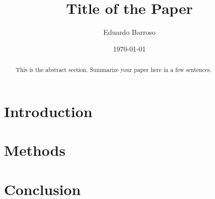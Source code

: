 \documentclass{document_layout}
\title{Title of the Paper}
\author{Eduardo Barroso}
\date{\today}
\begin{document}
\maketitle

\begin{abstract}
This is the abstract section. Summarize your paper here in a few sentences.
\end{abstract}
    
\section*{Introduction}


\section*{Methods}
%

\section*{Conclusion}
%

\onecolumn
\printbibliography
\twocolumn
\end{document}
